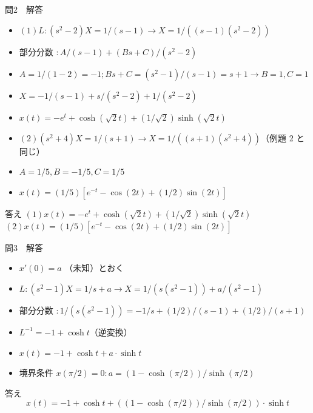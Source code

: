 \documentclass[aspectratio=43,professionalfonts,handout]{beamer}
\begin{document}
\begin{frame}{問2　解答}
  \begin{block}{}
  \begin{itemize}\setlength{\itemsep}{2pt}
    \item $(1) L: (s^{2}-2)X = 1/(s-1)   \to   X = 1/((s-1)(s^{2}-2))$
    \item 部分分数 $: A/(s-1) + (Bs+C)/(s^{2}-2)$
    \item $    A = 1/(1-2) = -1;  Bs+C = (s^{2}-1)/(s-1) = s+1   \to   B=1, C=1$
    \item $    X = -1/(s-1) + s/(s^{2}-2) + 1/(s^{2}-2)$
    \item $    x(t) = -e^t + \cosh(\sqrt2 t) + (1/\sqrt2)\sinh(\sqrt2 t)$
    \item $(2) (s^{2}+4)X = 1/(s+1)   \to   X = 1/((s+1)(s^{2}+4))$（例題 2 と同じ）
    \item $    A=1/5, B=-1/5, C=1/5$
    \item $    x(t) = (1/5)[e^{-t} - \cos(2t) + (1/2)\sin(2t)]$
  \end{itemize}
  \end{block}
  \begin{exampleblock}{答え}
  $(1) x(t) = -e^t + \cosh(\sqrt2 t) + (1/\sqrt2)\sinh(\sqrt2 t)$\\
  $(2) x(t) = (1/5)[e^{-t} - \cos(2t) + (1/2)\sin(2t)]$\\
  \end{exampleblock}
\end{frame}

\begin{frame}{問3　解答}
  \begin{block}{}
  \begin{itemize}\setlength{\itemsep}{2pt}
    \item $x'(0) = a$ （未知）とおく
    \item $L: (s^{2}-1)X = 1/s + a   \to   X = 1/(s(s^{2}-1)) + a/(s^{2}-1)$
    \item 部分分数 $: 1/(s(s^{2}-1)) = -1/s + (1/2)/(s-1) + (1/2)/(s+1)$
    \item $L^{-1} = -1 + \cosh t$（逆変換）
    \item $x(t) = -1 + \cosh t + a\cdot \sinh t$
    \item 境界条件 $x(\pi/2) = 0: a = (1 - \cosh(\pi/2))/\sinh(\pi/2)$
  \end{itemize}
  \end{block}
  \begin{exampleblock}{答え}
    \[
    x(t) = -1 + \cosh t + ((1-\cosh(\pi/2))/\sinh(\pi/2))\cdot \sinh t
  \]
  \end{exampleblock}
\end{frame}
\end{document}
